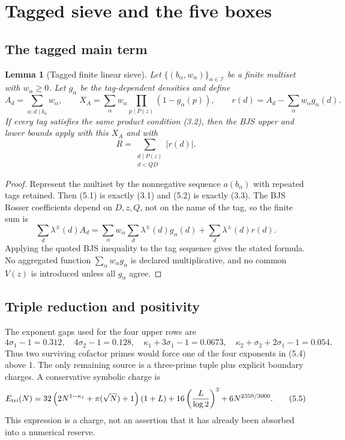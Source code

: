 \documentclass[11pt]{article}
\newtheorem{lemma}[theorem]{Lemma}
\theoremstyle{definition}
\begin{document}
\section{Tagged sieve and the five boxes}
\label{sec:boxes}

\subsection{The tagged main term}
\label{sec:tagged}

\begin{lemma}[Tagged finite linear sieve]
\label{lem:tagged}
Let \(\{(b_\alpha,w_\alpha)\}_{\alpha\in\mathcal I}\) be a finite multiset
with \(w_\alpha\ge0\).  Let \(g_\alpha\) be the tag-dependent densities and
define
\[
 A_d=\sum_{\alpha:d\mid b_\alpha}w_\alpha,\qquad
 X_A=\sum_\alpha w_\alpha
 \prod_{p\mid P(z)}(1-g_\alpha(p)),\qquad
 r(d)=A_d-\sum_\alpha w_\alpha g_\alpha(d).
\tag{5.1}
\]
If every tag satisfies the same product condition (3.2), then the BJS
upper and lower bounds apply with this \(X_A\) and with
\[
 R=\sum_{\substack{d\mid P(z)\\d<QD}}|r(d)|.
\tag{5.2}
\]
\end{lemma}

\begin{proof}
Represent the multiset by the nonnegative sequence
\(a(b_\alpha)\) with repeated tags retained.  Then (5.1) is exactly (3.1)
and (5.2) is exactly (3.3).  The BJS Rosser coefficients depend on \(D,z,Q\),
not on the name of the tag, so the finite sum is
\[
 \sum_d\lambda^\pm(d)A_d
 =\sum_\alpha w_\alpha\sum_d\lambda^\pm(d)g_\alpha(d)
 +\sum_d\lambda^\pm(d)r(d).
\tag{5.3}
\]
Applying the quoted BJS inequality to the tag sequence gives the stated
formula.  No aggregated function
\(\sum_\alpha w_\alpha g_\alpha\) is declared multiplicative, and no
common \(V(z)\) is introduced unless all \(g_\alpha\) agree.
\end{proof}

\subsection{Triple reduction and positivity}
\label{sec:triple}

The exponent gaps used for the four upper rows are
\[
4\sigma_1-1=0.312,\quad 4\sigma_2-1=0.128,\quad
\kappa_1+3\sigma_1-1=0.067\overline3,\quad
\kappa_2+\sigma_2+2\sigma_1-1=0.054.
\tag{5.4}
\]
Thus two surviving cofactor primes would force one of the four exponents in
(5.4) above \(1\).  The only remaining source is a three-prime tuple plus
explicit boundary charges.  A conservative symbolic charge is
\[
 E_{\rm tri}(N)=
 32\left(2N^{1-\kappa_1}+\pi(\sqrt N)+1\right)(1+L)
 +16\left(\frac L{\log2}\right)^3+6N^{2359/3000}.
\tag{5.5}
\]
This expression is a charge, not an assertion that it has already been
absorbed into a numerical reserve.
\end{document}
